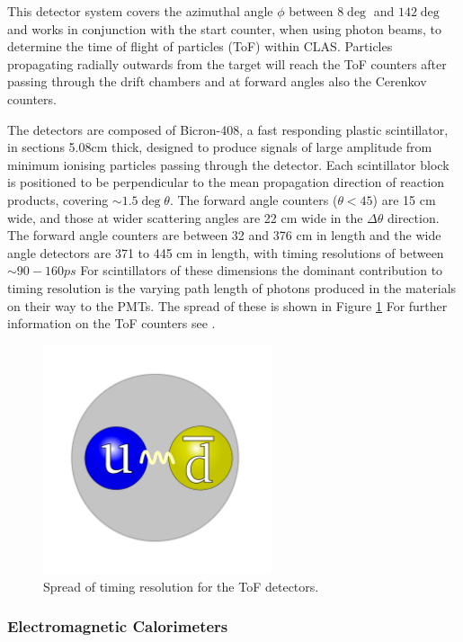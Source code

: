 This detector system covers the azimuthal angle $\phi$ between $8\deg$ and $142\deg$ and works in conjunction with the start counter, when using photon beams, to determine the time of flight of particles (ToF) within CLAS. Particles propagating radially outwards from the target will reach the ToF counters after passing through the drift chambers and at forward angles also the Cerenkov counters.

The detectors are composed of Bicron-408, a fast responding plastic scintillator, in sections 5.08cm thick, designed to produce signals of large amplitude from minimum ionising particles passing through the detector. Each scintillator block is positioned to be perpendicular to the mean propagation direction of reaction products, covering $\sim 1.5 \deg \theta$. The forward angle counters ($\theta < 45$) are 15 cm wide, and those at wider scattering angles are 22 cm wide in the $\Delta\theta$ direction. The forward angle counters are between 32 and 376 cm in length and the wide angle detectors are 371 to 445 cm in length, with timing resolutions of between $\sim 90-160 ps$ For scintillators of these dimensions the dominant contribution to timing resolution is the varying path length of photons produced in the materials on their way to the PMTs. The spread of these is shown in Figure \ref{CLAStof} For further information on the ToF counters see \cite{smith1999time}.

\begin{figure}
	\centering
	\includegraphics[width=0.6\textwidth]{ImgChap1/meson2}
	\caption{Spread of timing resolution for the ToF detectors.}
	\label{CLAStof}
\end{figure}

\subsubsection{Electromagnetic Calorimeters}


